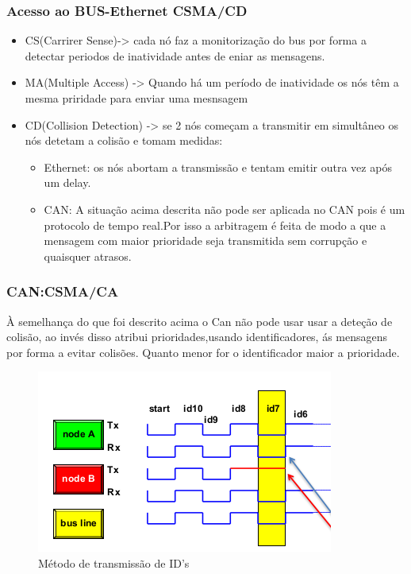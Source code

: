 \documentclass[10pt,a4paper]{paper}
\begin{document}
\subsubsection*{Acesso ao BUS-Ethernet CSMA/CD}

\begin{itemize}
	\item CS(Carrirer Sense)-> cada nó faz a monitorização do bus por forma a detectar periodos de inatividade antes de eniar as mensagens.
	\item MA(Multiple Access) -> Quando há um período de inatividade os nós têm a mesma priridade para enviar uma mesnsagem
	\item CD(Collision Detection) -> se 2 nós começam a transmitir em simultâneo os nós detetam a colisão e tomam medidas:
	\begin{itemize}
		\item Ethernet: os nós abortam a transmissão e tentam emitir outra vez após um delay.
		\item CAN: A situação acima descrita não pode ser aplicada no CAN pois é um protocolo de tempo real.Por isso a arbitragem é feita de modo a que a mensagem com maior prioridade seja transmitida sem corrupção e quaisquer atrasos.
	\end{itemize}
\end{itemize}

\newpage

\subsubsection*{CAN:CSMA/CA}

À semelhança do que foi descrito acima o Can não pode usar usar a deteção de colisão, ao invés disso atribui prioridades,usando identificadores, ás mensagens por forma a evitar colisões.
Quanto menor for o identificador  maior a prioridade.

 	\begin{figure}[ht]
		\includegraphics[scale=0.5] {fig14.png}
		\centering
		\caption {Método de transmissão de ID's}
		\label{fig:figura11}
	\end{figure}
\end{document}
